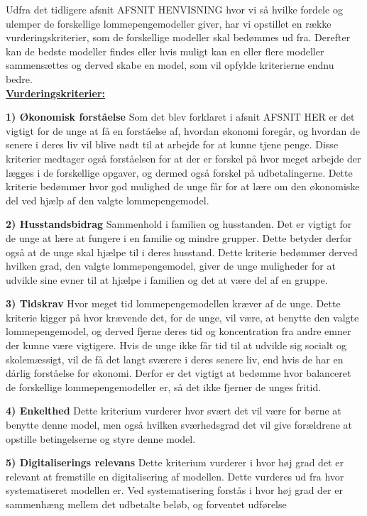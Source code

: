 Udfra det tidligere afsnit AFSNIT HENVISNING hvor vi så hvilke fordele og ulemper de forskellige lommepengemodeller giver, har vi opstillet en række vurderingskriterier, som de forskellige modeller skal bedømmes ud fra. Derefter kan de bedste modeller findes eller hvis muligt kan en eller flere modeller sammensættes og derved skabe en model, som vil opfylde kriterierne endnu bedre.\\

\noindent \uline{\textbf{Vurderingskriterier:}}

\textbf{1) Økonomisk forståelse}
Som det blev forklaret i afsnit AFSNIT HER er det vigtigt for de unge at få en forståelse af, hvordan økonomi foregår, og hvordan de senere i deres liv vil blive nødt til at arbejde for at kunne tjene penge. 
Disse kriterier medtager også forståelsen for at der er forskel på hvor meget arbejde der lægges i de forskellige opgaver, og dermed også forskel på udbetalingerne.
Dette kriterie bedømmer hvor god mulighed de unge får for at lære om den økonomiske del ved hjælp af den valgte lommepengemodel.

\textbf{2) Husstandsbidrag}
Sammenhold i familien og husstanden. 
Det er vigtigt for de unge at lære at fungere i en familie og mindre grupper. Dette betyder derfor også at de unge skal hjælpe til i deres husstand.
Dette kriterie bedømmer derved hvilken grad, den valgte lommepengemodel, giver de unge muligheder for at udvikle sine evner til at hjælpe i familien og det at være del af en gruppe.

\textbf{3) Tidskrav}
Hvor meget tid lommepengemodellen kræver af de unge.
Dette kriterie kigger på hvor krævende det, for de unge, vil være, at benytte den valgte lommepengemodel, og derved fjerne deres tid og koncentration fra andre emner der kunne være vigtigere. Hvis de unge ikke får tid til at udvikle sig socialt og skolemæssigt, vil de få det langt sværere i deres senere liv, end hvis de har en dårlig forståelse for økonomi.
Derfor er det vigtigt at bedømme hvor balanceret de forskellige lommepengemodeller er, så det ikke fjerner de unges fritid.

\textbf{4) Enkelthed}
Dette kriterium vurderer hvor svært det vil være for børne at benytte denne model, men også hvilken sværhedsgrad det vil give forældrene at opstille betingelserne og styre denne model.

\textbf{5) Digitaliserings relevans}
Dette kriterium vurderer i hvor høj grad det er relevant at fremstille en digitalisering af modellen. Dette vurderes ud fra hvor systematiseret modellen er. Ved systematisering forstås i hvor høj grad der er sammenhæng mellem det udbetalte beløb, og forventet udførelse%

